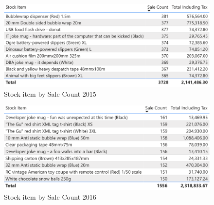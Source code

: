 \documentclass[12pt]{article}
\begin{document}
\begin{figure}[H]
    \centering
    \includegraphics [width=17.5cm]
    {images/Sales/stock item by Sale Count2015.png}
    \caption{Stock item by Sale Count 2015}
    \label{Stock item by Sale Count 2015}
\end{figure}
\begin{figure}[H]
    \centering
    \includegraphics [width=17.5cm]
    {images/Sales/stock item by Sale Count2016.png}
    \caption{Stock item by Sale Count 2016}
    \label{Stock item by Sale Count 2016}
\end{figure}
\end{document}
